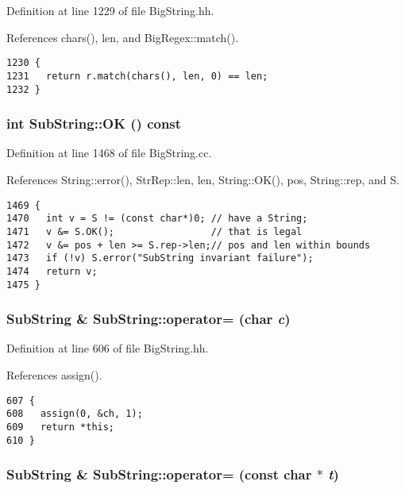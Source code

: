 Definition at line 1229 of file Big\-String.hh.

References chars(), len, and Big\-Regex::match().



\footnotesize\begin{verbatim}1230 {
1231   return r.match(chars(), len, 0) == len;
1232 }
\end{verbatim}\normalsize 
{}
\subsubsection{\setlength{\rightskip}{0pt plus 5cm}int Sub\-String::OK () const}\label{classSubString_a14}




Definition at line 1468 of file Big\-String.cc.

References String::error(), Str\-Rep::len, len, String::OK(), pos, String::rep, and S.



\footnotesize\begin{verbatim}1469 {
1470   int v = S != (const char*)0; // have a String;
1471   v &= S.OK();                 // that is legal
1472   v &= pos + len >= S.rep->len;// pos and len within bounds
1473   if (!v) S.error("SubString invariant failure");
1474   return v;
1475 }
\end{verbatim}\normalsize 
{}
\subsubsection{\setlength{\rightskip}{0pt plus 5cm}Sub\-String \& Sub\-String::operator= (char {\em c})\hspace{0.3cm}{\tt  [inline]}}\label{classSubString_a4}




Definition at line 606 of file Big\-String.hh.

References assign().



\footnotesize\begin{verbatim}607 {
608   assign(0, &ch, 1);
609   return *this;
610 }
\end{verbatim}\normalsize 
{}
\subsubsection{\setlength{\rightskip}{0pt plus 5cm}Sub\-String \& Sub\-String::operator= (const char $\ast$ {\em t})\hspace{0.3cm}{\tt  [inline]}}\label{classSubString_a3}




